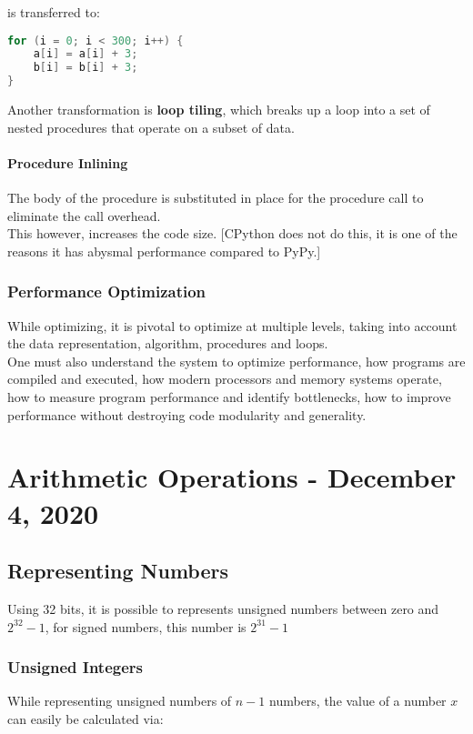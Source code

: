 \documentclass[11pt,a4paper,twocolumn]{book}
\begin{document}
is transferred to:
\begin{lstlisting}[language=C]
for (i = 0; i < 300; i++) {
	a[i] = a[i] + 3;
	b[i] = b[i] + 3;
}
\end{lstlisting}

Another transformation is \textbf{loop tiling}, which breaks up a loop into a set of nested procedures that operate on a subset of data.

\subsubsection{Procedure Inlining}

The body of the procedure is substituted in place for the procedure call to eliminate the call overhead.\\

This however, increases the code size. [CPython does not do this, it is one of the reasons it has abysmal performance compared to PyPy.]

\subsection{Performance Optimization}
While optimizing, it is pivotal to optimize at multiple levels, taking into account the data representation, algorithm, procedures and loops.\\

One must also understand the system to optimize performance, how programs are compiled and executed, how modern processors and memory systems operate, how to measure program performance and identify bottlenecks, how to improve performance without destroying code modularity and generality.

\chapter{Arithmetic Operations - December 4, 2020}

\section{Representing Numbers}

Using 32 bits, it is possible to represents unsigned numbers between zero and $2^{32} - 1$, for signed numbers, this number is $2^{31} - 1$\\

\subsection{Unsigned Integers}
While representing unsigned numbers of $n - 1$ numbers, the value of a number $x$ can easily be calculated via:
\end{document}
